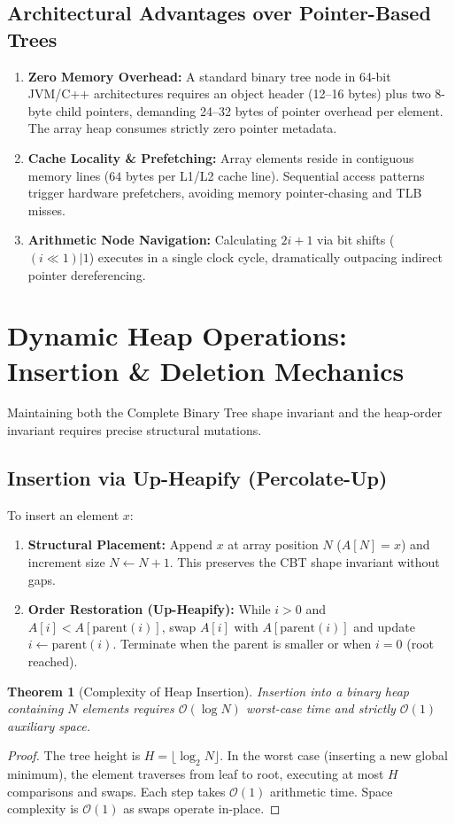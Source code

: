 \documentclass[10pt,twocolumn,letterpaper]{article}
\newtheorem{theorem}{Theorem}
\begin{document}
\subsection{Architectural Advantages over Pointer-Based Trees}
\begin{enumerate}
    \item \textbf{Zero Memory Overhead:} A standard binary tree node in 64-bit JVM/C++ architectures requires an object header (12--16 bytes) plus two 8-byte child pointers, demanding 24--32 bytes of pointer overhead per element. The array heap consumes strictly zero pointer metadata.
    \item \textbf{Cache Locality \& Prefetching:} Array elements reside in contiguous memory lines ($64$ bytes per L1/L2 cache line). Sequential access patterns trigger hardware prefetchers, avoiding memory pointer-chasing and TLB misses.
    \item \textbf{Arithmetic Node Navigation:} Calculating $2i+1$ via bit shifts ($(i \ll 1) | 1$) executes in a single clock cycle, dramatically outpacing indirect pointer dereferencing.
\end{enumerate}

\section{Dynamic Heap Operations: Insertion \& Deletion Mechanics}
\label{sec:operations}

Maintaining both the Complete Binary Tree shape invariant and the heap-order invariant requires precise structural mutations.

\subsection{Insertion via Up-Heapify (Percolate-Up)}
To insert an element $x$:
\begin{enumerate}
    \item \textbf{Structural Placement:} Append $x$ at array position $N$ ($A[N] = x$) and increment size $N \leftarrow N + 1$. This preserves the CBT shape invariant without gaps.
    \item \textbf{Order Restoration (Up-Heapify):} While $i > 0$ and $A[i] < A[\text{parent}(i)]$, swap $A[i]$ with $A[\text{parent}(i)]$ and update $i \leftarrow \text{parent}(i)$. Terminate when the parent is smaller or when $i = 0$ (root reached).
\end{enumerate}

\begin{theorem}[Complexity of Heap Insertion]
Insertion into a binary heap containing $N$ elements requires $\mathcal{O}(\log N)$ worst-case time and strictly $\mathcal{O}(1)$ auxiliary space.
\end{theorem}
\begin{proof}
The tree height is $H = \lfloor \log_2 N \rfloor$. In the worst case (inserting a new global minimum), the element traverses from leaf to root, executing at most $H$ comparisons and swaps. Each step takes $\mathcal{O}(1)$ arithmetic time. Space complexity is $\mathcal{O}(1)$ as swaps operate in-place.
\end{proof}
\end{document}
